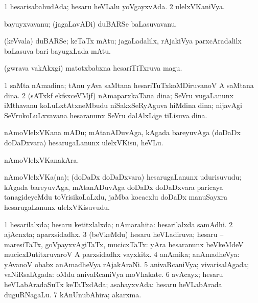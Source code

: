 \bentry
{}
\gl{\gu}
\bmng
\bnum
\num{1} hesarisabahudAda; hesaru heVLalu yoVgayxvAda. 
\num{2} ulelxVKaniVya. 
\enum
\emng
\eentry

\bentry
{}
\gl{\nA}
\bmng
bayuyxvavanu; (jagaLavADi) duBARSe baLasuvavanu. 
\emng
\eentry

\bentry
{}
\gl{\nA}
\bmng
(keVvala) duBARSe; keTaTx mAtu; jagaLadalilx, rAjakiVya parxcAradalilx baLasuva bari bayugxLada mAtu. 
\emng
\eentry

\bentry
{}
\gl{\nA}
\bmng
(gwrava \mo vakAkxgi) matotxbabxna hesariTiTxruva magu. 
\emng
\eentry

\bentry
{}
\gl{\nA}
\bmng
\bnum
\num{1} saMta nAmadina; tAnu yAva saMtana hesariTuTxkoMDiruvanoV A saMtana dina. 
\num{2} (sATxkf ekfsxceVMjf) nAmaparxkaTana dina; SeVru \mo vugaLanunx iMthavanu koLuLxtAtxneMbudu niSakxSeRyAguva hiMdina dina; nijavAgi SeVrukoLuLxvavana hesaranunx SeVru dalAlxLige tiLisuva dina. 
\enum
\emng
\eentry

\bentry
{}
\gl{\akirx}
\bmng
nAmoVlelxVKana mADu; mAtanADuvAga, kAgada bareyuvAga (doDaDx doDaDxvara) hesarugaLanunx ulelxVKisu, heVLu. 
\emng
\eentry

\bentry
{}
\gl{\nA}
\bmng
nAmoVlelxVKanakAra. 
\emng
\eentry

\bentry
{}
\gl{\nA}
\bmng
nAmoVlelxVKa(na); (doDaDx doDaDxvara) hesarugaLanunx udurisuvudu; kAgada bareyuvAga, mAtanADuvAga doDaDx doDaDxvara paricaya tanagideyeMdu toVrisikoLaLxlu, jaMba kocacxlu doDaDx manuSayxra hesarugaLanunx ulelxVKisuvudu. 
\emng
\eentry

\bentry
{}
\gl{\gu}
\bmng
\bnum
\num{1} hesarilalxda; hesaru ketitxlalxda; nAmarahita:  hesarilalxda samAdhi. 
\num{2} ajAcnxta; aparxsidadhx. 
\num{3} (beVkeMdu) hesaru heVLadiruva; hesaru -- maresiTaTx, goVpayxvAgiTaTx, mucicxTaTx:  yAra hesaranunx beVkeMdeV mucicxDutitxruvaroV A parxsidadhx vayxkitx. 
\num{4} anAmika; anAmadheVya:  yAvanoV obabx anAmadheVya rAjakAraNi. 
\num{5} anivaRcaniVya; vivarisalAgada; vaNiRsalAgada:  oMdu anivaRcaniVya moVhakate. 
\num{6} avAcayx; hesaru heVLabAradaSuTx keTaTxdAda; asahayxvAda:  hesaru heVLabArada duguRNagaLu. 
\num{7} kAnUnubAhira; akarxma. 
\enum
\emng
\eentry

